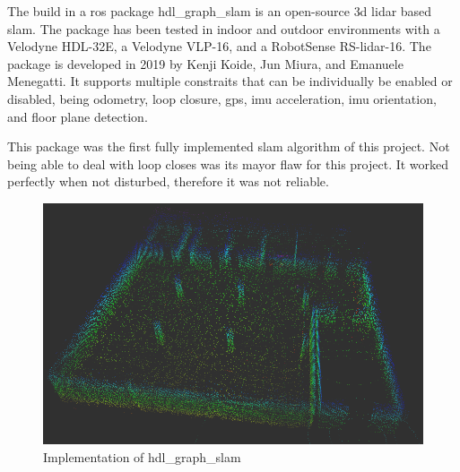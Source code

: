 The build in a \acs{ros} package \mbox{hdl\_graph\_slam} is an open\hyp{}source \acs{3d} \acs{lidar} based \acs{slam}. The package has been tested in indoor and outdoor environments with a Velodyne HDL\hyp{}32E, a Velodyne VLP\hyp{}16, and a RobotSense RS\hyp{}\acs{lidar}\hyp{}16. The package is developed in 2019 by Kenji Koide, Jun Miura, and Emanuele Menegatti. It supports multiple constraits that can be individually be enabled or disabled, being odometry, loop closure, \acs{gps}, \acs{imu} acceleration, \acs{imu} orientation, and floor plane detection. \cite{koide2019portable}

This package was the first fully implemented \acs{slam} algorithm of this project. Not being able to deal with loop closes was its mayor flaw for this project. It worked perfectly when not disturbed, therefore it was not reliable.

\begin{figure}[!h]
  \centering
  \includegraphics[width=0.7\linewidth]{images/hdl_graph_slam_implementation.png}
  \caption{Implementation of hdl\_graph\_slam}
  \label{fig:hdl_graph_slam_implementation}
\end{figure}